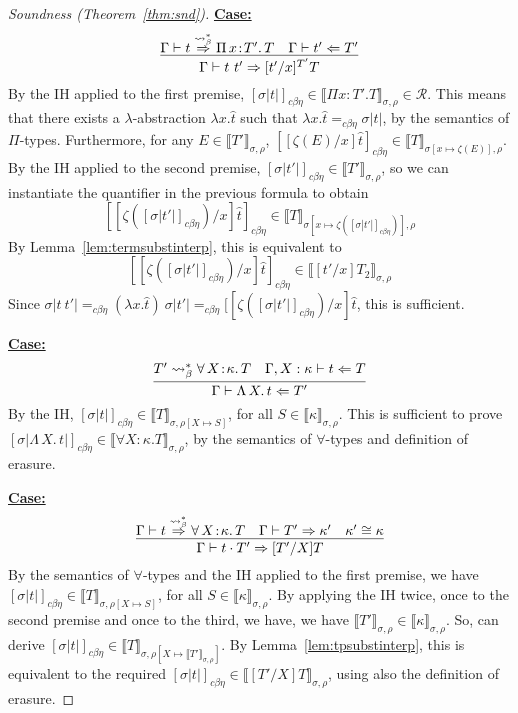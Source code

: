 \documentclass{article}
\newcommand{\choice}[0]{\zeta}
\newcommand{\abs}[4]{{#1}\, #2\! : \! #3.\, #4}
\newcommand{\absu}[3]{{#1}\, #2.\, #3}
\newcommand{\interp}[1]{\llbracket #1 \rrbracket}
\newcommand{\tpcheck}[0]{\Leftarrow}
\newcommand{\tpsynth}[0]{\Rightarrow}
\newcommand{\tpsynthleads}[0]{\ensuremath{\overset{\leadsto_\beta^*}{\Rightarrow}}}
\newcommand{\cbe}[0]{c\beta\eta}
\newcommand{\startcase}[1]{\vspace{#1} \noindent\textbf{\underline{Case:}}}
\begin{document}
\begin{proof}[Soundness (Theorem~\ref{thm:snd})]
\startcase{.2cm}
\[
  \infer{\Gamma\vdash t\ t' \tpsynth [t'/x]^{T'}T}{\Gamma\vdash t \tpsynthleads \abs{\Pi}{x}{T'}{T} & \Gamma\vdash t' \tpcheck T'} \\ \\
\]
By the IH applied to the first premise, $[\sigma
|t|]_{\cbe}\in\interp{\Pi x:T'.T}_{\sigma,\rho}\in\mathcal{R}$.  This
means that there exists a $\lambda$-abstraction $\lambda x.\hat{t}$
such that $\lambda x.\hat{t} =_{\cbe} \sigma |t|$, by the semantics of $\Pi$-types.
Furthermore, for any $E\in\interp{T'}_{\sigma,\rho}$,
$[[\choice(E)/x]\hat{t}]_{\cbe}\in\interp{T}_{\sigma[x\mapsto\choice(E)],\rho}$.
By the IH applied to the second premise, $[\sigma |t'|]_{\cbe}\in\interp{T'}_{\sigma,\rho}$,
so we can instantiate the quantifier in the previous formula to obtain
\[
 [[\choice([\sigma |t'|]_{\cbe})/x]\hat{t}]_{\cbe}\in\interp{T}_{\sigma[x\mapsto\choice([\sigma |t'|]_{\cbe})],\rho}
\]
By Lemma~\ref{lem:termsubstinterp}, this is equivalent to
\[
 [[\choice([\sigma |t'|]_{\cbe})/x]\hat{t}]_{\cbe}\in\interp{[t'/x]T_2}_{\sigma,\rho}
\]
Since $\sigma |t\ t'| =_{\cbe} (\lambda x.\hat{t})\ \sigma |t'| =_{\cbe} [[\choice([\sigma |t'|]_{\cbe})/x]\hat{t}$,
this is sufficient.

\startcase{.2cm}
\[
  \infer{\Gamma\vdash \absu{\Lambda}{X}{t} \tpcheck T'}
  {T' \leadsto_\beta^* \abs{\forall}{X}{\kappa}{T} & \Gamma,X:\kappa\vdash t \tpcheck T}
\]
By the IH, $[\sigma |t|]_{\cbe}\in\interp{T}_{\sigma,\rho[X\mapsto S]}$, for all $S\in\interp{\kappa}_{\sigma,\rho}$.
This is sufficient to prove $[\sigma |\absu{\Lambda}{X}{t}|]_{\cbe}\in\interp{\forall X:\kappa.T}_{\sigma,\rho}$, by the semantics
of $\forall$-types and definition of erasure.

\startcase{.2cm}
\[
  \infer{\Gamma\vdash t \cdot T' \tpsynth [T'/X]T}
  {\Gamma\vdash t \tpsynthleads \abs{\forall}{X}{\kappa}{T} & \Gamma\vdash T' \tpsynth \kappa' & \kappa'\cong\kappa} \\ \\
\]
By the semantics of $\forall$-types and the IH applied to the first
premise, we have $[\sigma |t|]_{\cbe}\in\interp{T}_{\sigma,\rho[X\mapsto
  S]}$, for all $S\in\interp{\kappa}_{\sigma,\rho}$.
By applying the IH twice, once to the second premise and once to the third, we
have, we have \(\interp{T'}_{\sigma,\rho} \in \interp{\kappa}_{\sigma,\rho}\).
So, can derive $[\sigma |t|]_{\cbe}\in\interp{T}_{\sigma,\rho[X\mapsto \interp{T'}_{\sigma,\rho}]}$.
By Lemma~\ref{lem:tpsubstinterp},
this is equivalent to the required $[\sigma |t|]_{\cbe}\in\interp{[T'/X]T}_{\sigma,\rho}$,
using also the definition of erasure.


\end{proof}
\end{document}
